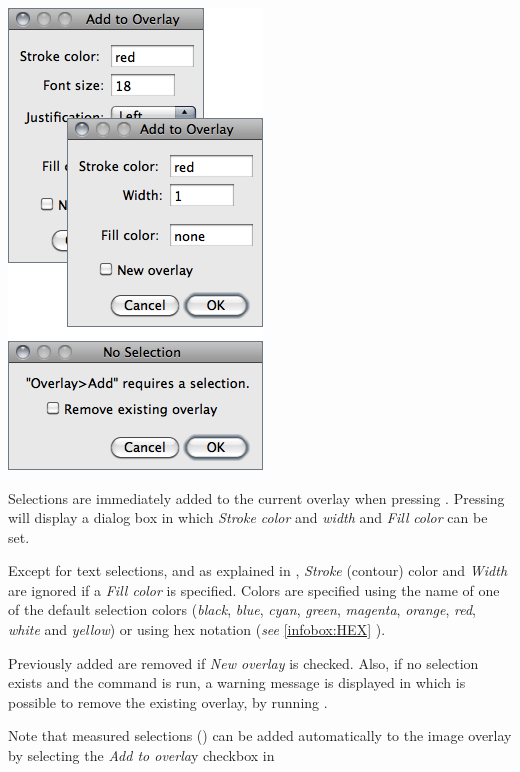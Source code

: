 \subsubsection[{\protect\userinterface{Add Selection\ldots{}\ {[}b{]}}}]{\protect{}\label{sub:Add-Selection...[b]}\improvement{}}

\begin{minipage}[c][1\totalheight][t]{0.373\columnwidth}%
\includegraphics[scale=0.55]{images/AddToOverlay}%
\end{minipage}%
\begin{minipage}[c][1\totalheight][t]{0.627\columnwidth}%
Selections are immediately added to the current overlay when pressing
. Pressing   will
display a dialog box in which\emph{ Stroke color} and \emph{width}
and \emph{Fill} \emph{color} can be set.\medskip{}


Except for text selections, and as explained in ,
\emph{Stroke} (contour) color and \emph{Width} are ignored if a \emph{Fill
color} is specified. Colors are specified using the name of one of
the default selection colors (\emph{black}, \emph{blue}, \emph{cyan},
\emph{green}, \emph{magenta}, \emph{orange},\emph{ red}, \emph{white}
and \emph{yellow}) or using hex notation (\emph{see} \ref{infobox:HEX}
).

\medskip{}
Previously added  are removed if \emph{New
overlay} is checked. Also, if no selection exists and the command
is run, a warning message is displayed in which is possible to remove
the existing overlay, by running .
\medskip{}


Note that measured selections ()
can be added automatically to the image overlay by selecting the \emph{Add
to overla}y checkbox in %
\end{minipage}


